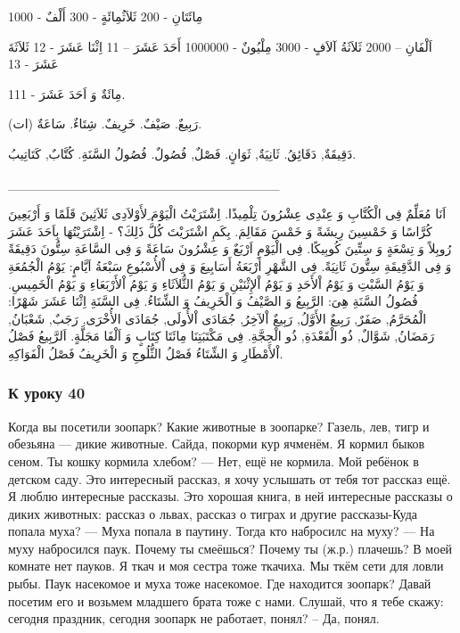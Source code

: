 \documentclass[a5paper]{article}
\begin{document}
مِائَتَانِ - 200 ثَلاَثُمِائَةٍ - 300 أَلْفٌ - 1000 

اَلْفَانِ – 2000 ثَلاَثَةُ آلاَفٍ - 3000 مِلْيُونٌ - 1000000 أَحَدَ عَشَرَ – 11 اِثْنَا عَشَرَ - 12 ثَلاَثَةَ عَشَرَ - 13 

مِائَةٌ وَ اَحَدَ عَشَرَ - 111. 

رَبِيعٌ. صَيْفٌ. خَرِيفٌ. شِتَاءٌ. سَاعَةٌ (ات). 

دَقِيقَةٌ, دَقَائِقُ. ثَانِيَةٌ, ثَوَانٍ. فَصْلٌ, فُصُولٌ. فُصُولُ السَّنَةِ. كُتَّابٌ, كَتَاتِيبُ.

\_\_\_\_\_\_\_\_\_\_\_\_\_\_\_\_\_\_\_\_\_\_\_\_\_\_\_\_\_

اَنَا مُعَلِّمٌ فِى الْكُتَّابِ وَ عِنْدِى عِشْرُونَ تِلْمِيذًا. اِشْتَرَيْتُ الْيَوْمَ ِلأَوْلاَدِى ثَلاَثِينَ قَلَمًا وَ أَرْبَعِينَ كُرَّاسًا وَ خَمْسِينَ رِيشَةً وَ خَمْسَ مَقَالِمَ. بِكَمِ اشْتَرَيْتَ كُلَّ ذَلِكَ؟ - اِشْتَرَيْتُهَا بِاَحَدَ عَشَرَ رُوبِلاً وَ تِسْعَةٍ وَ سِتِّينَ كُوبِيكًا. فِى الْيَوْمِ اَرْبَعٌ وَ عِشْرُونَ سَاعَةً وَ فِى السَّاعَةِ سِتُّونَ دَقِيقَةً وَ فِى الدَّقِيقَةِ سِتُّونَ ثَانِيَةً. فِى الشَّهْرِ أَرْبَعَةُ أَسَابِيعَ وَ فِى اْلأُسْبُوعِ سَبْعَةُ اَيَّامٍ: يَوْمُ الْجُمُعَةِ وَ يَوْمُ السَّبْتِ وَ يَوْمُ اْلأَحَدِ وَ يَوْمُ اْلإِثْنَيْنِ وَ يَوْمُ الثُّلاَثَاءِ وَ يَوْمُ اْلأَرْبَعَاءِ وَ يَوْمُ الْخَمِيسِ. فُصُولُ السَّنَةِ هِىَ: الرَّبِيعُ وَ الصَّيْفُ وَ الْخَرِيفُ وَ الشِّتَاءُ. فِى السَّنَةِ اِثْنَا عَشَرَ شَهْرًا: الْمُحَرَّمُ, صَفَرٌ, رَبِيعٌ الأَوَّلُ, رَبِيعٌ اْلآخِرُ, جُمَادَى اْلأُولَى, جُمَادَى الأُخْرَى, رَجَبٌ, شَعْبَانُ, رَمَضَانُ, شَوَّالٌ, ذُو الْقَعْدَةِ, ذُو الْحِجَّةِ. فِى مَكْتَبَتِنَا مِائَتَا كِتَابٍ وَ اَلْفَا مَجَلَّةٍ. اَلرَّبِيعُ فَصْلُ اْلأَمْطَارِ وَ الشِّتَاءُ فَصْلُ الثُّلُوجِ وَ الْخَرِيفُ فَصْلُ الْفَوَاكِهِ.

\subsubsection{К уроку 40}
Когда вы посетили зоопарк? Какие животные в зоопарке? Газель, лев, тигр и обезьяна — дикие животные. Сайда, покорми кур ячменём. Я кормил быков сеном. Ты кошку кормила хлебом? — Нет, ещё не кормила. Мой ребёнок в детском саду. Это интересный рассказ, я хочу услышать от тебя тот рассказ ещё. Я люблю интересные рассказы. Это хорошая книга, в ней интересные рассказы о диких животных: рассказ о львах, рассказ о тиграх и другие рассказы-Куда попала муха? — Муха попала в паутину. Тогда кто набросилс на муху? — На муху набросился паук. Почему ты смеёшься? Почему ты (ж.р.) плачешь? В моей комнате нет пауков. Я ткач и моя сестра тоже ткачиха. Мы ткём сети для ловли рыбы. Паук насекомое и муха тоже насекомое. Где находится зоопарк? Давай посетим его и возьмем младшего брата тоже с нами. Слушай, что я тебе скажу: сегодня праздник, сегодня зоопарк не работает, понял? – Да, понял. 
\end{document}

